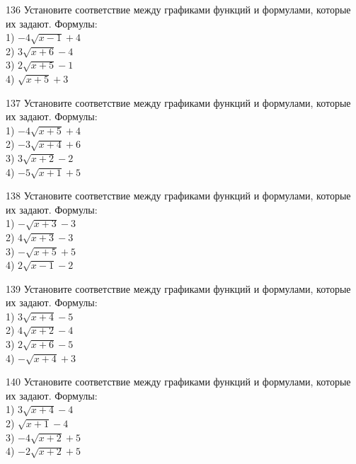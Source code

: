 \documentclass[4apaper]{article}
\begin{document}
\begin{taskBN}{136}
Установите соответствие между графиками функций и формулами, которые их задают. Формулы: \\1) $-4\sqrt{x-1}+4$\\2) $3\sqrt{x+6}-4$\\3) $2\sqrt{x+5}-1$\\4) $\sqrt{x+5}+3$
\end{taskBN}

\begin{taskBN}{137}
Установите соответствие между графиками функций и формулами, которые их задают. Формулы: \\1) $-4\sqrt{x+5}+4$\\2) $-3\sqrt{x+4}+6$\\3) $3\sqrt{x+2}-2$\\4) $-5\sqrt{x+1}+5$
\end{taskBN}

\begin{taskBN}{138}
Установите соответствие между графиками функций и формулами, которые их задают. Формулы: \\1) $-\sqrt{x+3}-3$\\2) $4\sqrt{x+3}-3$\\3) $-\sqrt{x+5}+5$\\4) $2\sqrt{x-1}-2$
\end{taskBN}

\begin{taskBN}{139}
Установите соответствие между графиками функций и формулами, которые их задают. Формулы: \\1) $3\sqrt{x+4}-5$\\2) $4\sqrt{x+2}-4$\\3) $2\sqrt{x+6}-5$\\4) $-\sqrt{x+4}+3$
\end{taskBN}

\begin{taskBN}{140}
Установите соответствие между графиками функций и формулами, которые их задают. Формулы: \\1) $3\sqrt{x+4}-4$\\2) $\sqrt{x+1}-4$\\3) $-4\sqrt{x+2}+5$\\4) $-2\sqrt{x+2}+5$
\end{taskBN}
\end{document}
